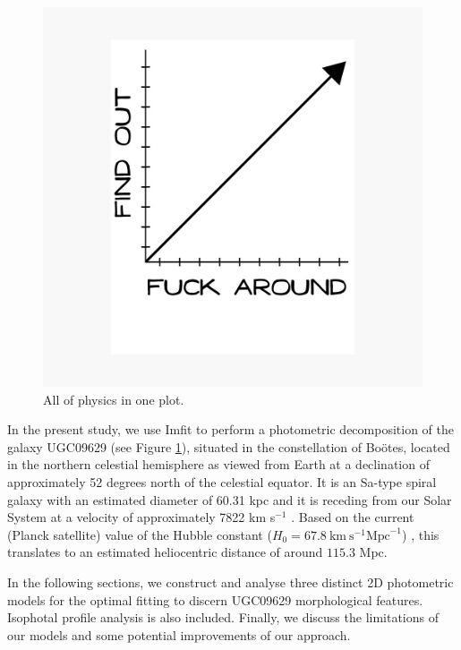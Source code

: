 \begin{figure}
  \centering
  \includegraphics[width=1\columnwidth]{images/graph.jpg}  %
  \caption{\small All of physics in one plot.}
  \label{fig:1}
\end{figure}

%

In the present study, we use Imfit to perform a photometric decomposition of the galaxy UGC09629 (see Figure \ref{fig:1}), situated in the constellation of Boötes, located in the northern celestial hemisphere as viewed from Earth at a declination of approximately 52 degrees north of the celestial equator. It is an Sa-type spiral galaxy with an estimated diameter of 60.31 kpc and it is receding from our Solar System at a velocity of approximately 7822 km s$^{-1}$ \citep{ned}. Based on the current (Planck satellite) value of the Hubble constant ($H_0=67.8 \ \text{km} \ \text{s}^{-1} \text{Mpc}^{-1}$) \citep{aghanim2020planck}, this translates to an estimated heliocentric distance of around $115.3$ Mpc.

In the following sections, we construct and analyse three distinct 2D photometric models for the optimal fitting to discern UGC09629 morphological features. Isophotal profile analysis is also included. Finally, we discuss the limitations of our models and some potential improvements of our approach.




